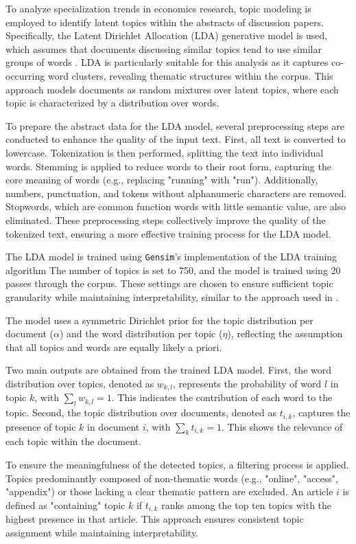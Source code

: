\documentclass[11pt, a4paper, leqno]{article}
\begin{document}
To analyze specialization trends in economics research, topic modeling is employed to identify latent topics within the abstracts of discussion papers.
Specifically, the Latent Dirichlet Allocation (LDA) generative model is used, which assumes that documents discussing similar topics tend to use similar groups of words \cite{blei2003}.
LDA is particularly suitable for this analysis as it captures co-occurring word clusters, revealing thematic structures within the corpus.
This approach models documents as random mixtures over latent topics, where each topic is characterized by a distribution over words.

To prepare the abstract data for the LDA model, several preprocessing steps are conducted to enhance the quality of the input text.
First, all text is converted to lowercase.
Tokenization is then performed, splitting the text into individual words.
Stemming is applied to reduce words to their root form, capturing the core meaning of words (e.g., replacing "running" with "run").
Additionally, numbers, punctuation, and tokens without alphanumeric characters are removed.
Stopwords, which are common function words with little semantic value, are also eliminated.
These preprocessing steps collectively improve the quality of the tokenized text, ensuring a more effective training process for the LDA model.

The LDA model is trained using \texttt{Gensim}'s implementation of the LDA training algorithm
The number of topics is set to 750, and the model is trained using 20 passes through the corpus.
These settings are chosen to ensure sufficient topic granularity while maintaining interpretability, similar to the approach used in \cite{galiani2023a}.

The model uses a symmetric Dirichlet prior for the topic distribution per document ($\alpha$) and the word distribution per topic ($\eta$), reflecting the assumption that all topics and words are equally likely a priori.

Two main outputs are obtained from the trained LDA model. First, the word distribution over topics, denoted as $w_{k,l}$, represents the probability of word $l$ in topic $k$, with $\sum_l w_{k,l} = 1$.
This indicates the contribution of each word to the topic.
Second, the topic distribution over documents, denoted as $t_{i,k}$, captures the presence of topic $k$ in document $i$, with $\sum_k t_{i,k} = 1$.
This shows the relevance of each topic within the document.

To ensure the meaningfulness of the detected topics, a filtering process is applied.
Topics predominantly composed of non-thematic words (e.g., "online", "access", "appendix") or those lacking a clear thematic pattern are excluded.
An article $i$ is defined as "containing" topic $k$ if $t_{i,k}$ ranks among the top ten topics with the highest presence in that article.
This approach ensures consistent topic assignment while maintaining interpretability.
\end{document}
